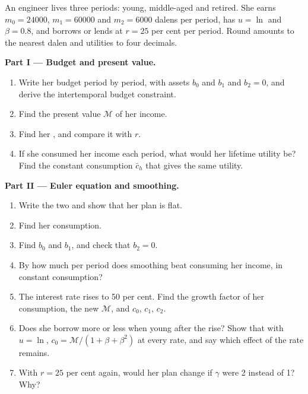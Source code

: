 \begin{problem}
\label{pb:b2:intertemporal-choice:1}
An engineer lives three periods: young, middle-aged and retired. She earns $m_0 = \num{24000}$, $m_1 =
\num{60000}$ and $m_2 = \num{6000}$ dalens per period, has $u = \ln$ and $\beta = 0.8$, and borrows or
lends at $r = 25$ per cent per period. Round amounts to the nearest dalen and utilities to four
decimals.

\medskip
\noindent\textbf{Part I --- Budget and present value.}
\begin{enumerate}
  \item Write her budget period by period, with assets $b_0$ and $b_1$ and $b_2 = 0$, and derive the
        intertemporal budget constraint.
  \item Find the present value $\mathcal{M}$ of her income.
  \item Find her , and compare it with $r$.
  \item If she consumed her income each period, what would her lifetime utility be? Find the constant
        consumption $\bar c_h$ that gives the same utility.
\end{enumerate}

\medskip
\noindent\textbf{Part II --- Euler equation and smoothing.}
\begin{enumerate}[resume]
  \item Write the two  and show that her plan is flat.
  \item Find her consumption.
  \item Find $b_0$ and $b_1$, and check that $b_2 = 0$.
  \item By how much per period does smoothing beat consuming her income, in constant consumption?
  \item The interest rate rises to 50 per cent. Find the growth factor of her consumption, the new
        $\mathcal{M}$, and $c_0$, $c_1$, $c_2$.
  \item Does she borrow more or less when young after the rise? Show that with $u = \ln$, $c_0 =
        \mathcal{M}/(1 + \beta + \beta^2)$ at every rate, and say which effect of the rate remains.
  \item With $r = 25$ per cent again, would her plan change if $\gamma$ were 2 instead of 1? Why?
\end{enumerate}


\end{problem}
